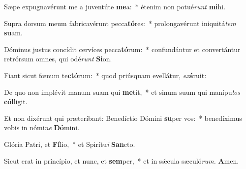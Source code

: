 \item Sæpe expugnavérunt me a juventúte \textbf{me}a:~* étenim non potué\hspace*{0.02em}\textit{runt} \textbf{mi}hi.
\item Supra dorsum meum fabricavérunt pecca\textbf{tó}res:~* prolongavérunt iniquitá\tinyhspace\textit{tem} \textbf{su}am.
\item Dóminus justus concídit cervíces pecca\textbf{tó}rum:~* confundántur et convertántur retrórsum omnes, qui odé\tinyhspace\textit{runt} \textbf{Si}on.
\item Fiant sicut fœnum te\textbf{ctó}rum:~* quod priúsquam evellátur, \textit{ex}\textbf{á}ruit:
\item De quo non implévit manum suam qui \textbf{me}tit,~* et sinum suum qui manípu\tinyhspace\textit{los} \textbf{cól}ligit.
\item Et non dixérunt qui præteríbant: Benedíctio Dómini \textbf{su}per vos:~* benedíximus vobis in nómi\textit{ne} \textbf{Dó}mini.
\item Glória Patri, et \textbf{Fí}lio,~* et Spirítu\tinyhspace\textit{i} \textbf{San}cto.
\item Sicut erat in princípio, et nunc, et \textbf{sem}per,~* et in sǽcula sæculó\textit{rum.} \textbf{A}men.